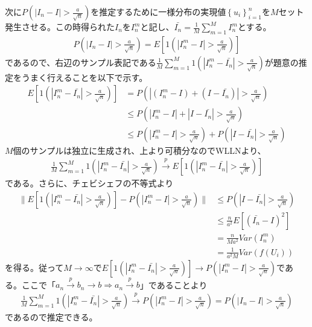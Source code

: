 \documentclass{article}
\begin{document}
次に$P\left( | I_n - I | > \frac{a}{\sqrt{n}} \right)$を推定するために一様分布の実現値$\left\{ u_i \right\}_{i=1}^n$を$M$セット発生させる。この時得られた$I_n$を$I_n^m$と記し、$\bar{I_n} = \frac{1}{M} \sum_{m=1}^M I_n^m$とする。
\begin{align*}
	P\left( | I_n - I | > \frac{a}{\sqrt{n}} \right) = E\left[ 1\left(  | I_n^m - I | > \frac{a}{\sqrt{n}} \right) \right]
\end{align*}
であるので、右辺のサンプル表記である$\frac{1}{M} \sum_{m=1}^M 1\left(  | I_n^m - \bar{I_n} | > \frac{a}{\sqrt{n}} \right)$が題意の推定をうまく行えることを以下で示す。
\begin{align*}
	E\left[ 1\left(  | I_n^m - \bar{I_n} | > \frac{a}{\sqrt{n}} \right) \right] &= P\left( | (I_n^m - I) + (I - \bar{I_n}) |  > \frac{a}{\sqrt{n}} \right) \\
	&\leq P\left( | I_n^m - I |+ |I - \bar{I_n}|  > \frac{a}{\sqrt{n}} \right)\\
	& \leq P\left( | I_n^m - I |> \frac{a}{\sqrt{n}} \right) + P\left( |I - \bar{I_n}|  > \frac{a}{\sqrt{n}} \right)
\end{align*}
$M$個のサンプルは独立に生成され、上より可積分なのでWLLNより、
\begin{align*}
\frac{1}{M} \sum_{m=1}^M 1\left(  | I_n^m - \bar{I_n} | > \frac{a}{\sqrt{n}} \right) \xrightarrow{p} E\left[ 1\left(  | I_n^m - \bar{I_n} | > \frac{a}{\sqrt{n}} \right) \right]
\end{align*}
である。さらに、チェビシェフの不等式より
\begin{align*}
	\| E\left[ 1\left(  | I_n^m - \bar{I_n} | > \frac{a}{\sqrt{n}} \right) \right] - P\left( | I_n^m - I |> \frac{a}{\sqrt{n}} \right)  \| &\leq P\left( |I - \bar{I_n}|  > \frac{a}{\sqrt{n}} \right)\\
	&\leq \frac{n}{a^2} E\left[ \left( \bar{I_n} - I \right)^2 \right]\\
	&= \frac{n}{Ma^2} Var\left(I_n^m \right)\\
	&= \frac{1}{a^2M} Var\left( f(U_i) \right)
\end{align*}
を得る。従って$M\to \infty$で$E\left[ 1\left(  | I_n^m - \bar{I_n} | > \frac{a}{\sqrt{n}} \right) \right] \to P\left( | I_n^m - I |> \frac{a}{\sqrt{n}} \right)$である。ここで「$a_n \xrightarrow{p} b_n \to b \Rightarrow a_n \xrightarrow{p} b$」であることより
\begin{align*}
	\frac{1}{M} \sum_{m=1}^M 1\left(  | I_n^m - \bar{I_n} | > \frac{a}{\sqrt{n}} \right) \xrightarrow{p} P\left( | I_n^m - I |> \frac{a}{\sqrt{n}} \right) = P\left( | I_n - I |> \frac{a}{\sqrt{n}} \right)
\end{align*}
であるので推定できる。
\end{document}
